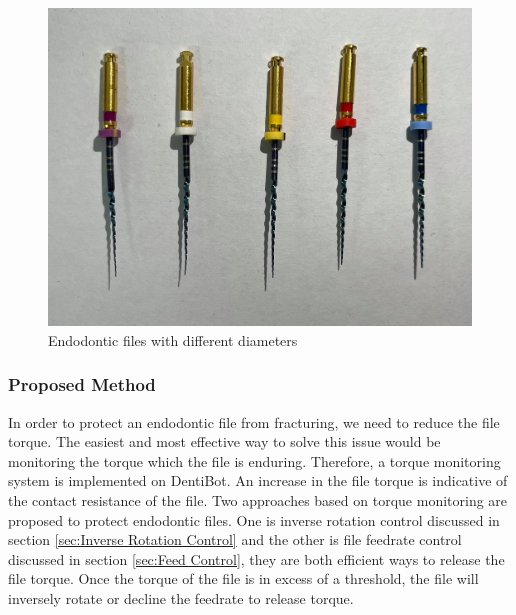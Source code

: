 \begin{figure}[htbp]
\begin{center}
\includegraphics[width=0.7\linewidth]{Images/files.jpg}
\caption{Endodontic files with different diameters
}\label{fig: files}
\end{center}
\end{figure}	
\subsubsection{Proposed Method}
\hspace*{6mm}In order to protect an endodontic file from fracturing, we need to reduce the file torque. The easiest and most effective way to solve this issue would be monitoring the torque which the file is enduring. Therefore, a torque monitoring system is implemented on DentiBot. An increase in the file torque is indicative of the contact resistance of the file. Two approaches based on torque monitoring are proposed to protect endodontic files. One is inverse rotation control discussed in section \ref{sec:Inverse Rotation Control} and the other is file feedrate control discussed in section \ref{sec:Feed Control}, they are both efficient ways to release the file torque. Once the torque of the file is in excess of a threshold, the file will inversely rotate or decline the feedrate to release torque. 
